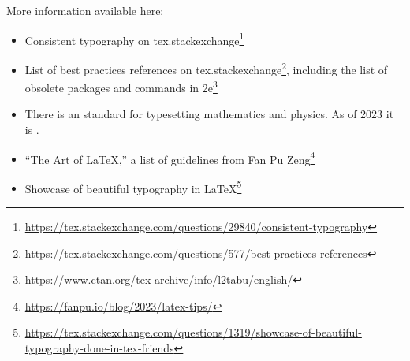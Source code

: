 More information available here:
\begin{itemize}
	\item Consistent typography on tex.stackexchange\footnote{\url{https://tex.stackexchange.com/questions/29840/consistent-typography}}
	\item List of best practices references on tex.stackexchange\footnote{\url{https://tex.stackexchange.com/questions/577/best-practices-references}}, including the list of obsolete packages and commands in 2e\footnote{\url{https://www.ctan.org/tex-archive/info/l2tabu/english/}}
	\item There is an  standard for typesetting mathematics and physics. As of 2023 it is .
	\item ``The Art of \LaTeX,'' a list of guidelines from Fan Pu Zeng\footnote{\url{https://fanpu.io/blog/2023/latex-tips/}}
	\item Showcase of beautiful typography in \LaTeX\footnote{\url{https://tex.stackexchange.com/questions/1319/showcase-of-beautiful-typography-done-in-tex-friends}}
\end{itemize}
